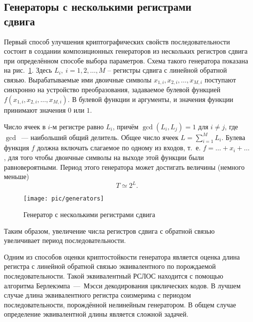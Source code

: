 \subsection[Генераторы с несколькими регистрами сдвига]{Генераторы с несколькими регистрами \protect\\ сдвига}

Первый способ улучшения криптографических свойств последовательности состоит в создании композиционных генераторов из нескольких регистров сдвига при определённом способе выбора параметров. Схема такого генератора показана на рис.~\ref{fig:generators}. Здесь $L_i, ~ i = 1, 2, \dots, M$ -- регистры сдвига с линейной обратной связью. Вырабатываемые ими двоичные символы $x_{1,i}, x_{2,i}, \dots, x_{M,i}$ поступают синхронно на устройство преобразования, задаваемое булевой функцией $f(x_{1,i}, x_{2,i}, \dots, x_{M,i})$. В булевой функции и аргументы, и значения функции принимают значения $0$ или $1$.

Число ячеек в $i$-м регистре равно $L_{i}$, причём $\gcd(L_i, L_j)=1$ для $i \neq j$, где $\gcd$~--- наибольший общий делитель. Общее число ячеек $L = \sum\limits_{i=1}^M L_i$. Булева функция $f$ должна включать слагаемое по одному из входов, т.~е. $f = \dots + x_i + \dots$, для того чтобы двоичные символы на выходе этой функции были равновероятными. Период этого генератора может достигать величины (немного меньше)
    \[ T \simeq 2^L. \]

\begin{figure}[!ht]
	\centering
	\texttt{[image: pic/generators]}
    \caption{Генератор с несколькими регистрами сдвига\label{fig:generators}}
\end{figure}

Таким образом, увеличение числа регистров сдвига с обратной связью увеличивает период последовательности.

Одним из способов оценки криптостойкости генератора является оценка длина регистра с линейной обратной связью эквивалентного по порождаемой последовательности. Такой эквивалентный РСЛОС находится с помощью алгоритма Берлекэмпа~---~Мэсси декодирования циклических кодов. В лучшем случае длина эквивалентного регистра соизмерима с периодом последовательности, порождённой нелинейным генератором. В общем случае определение эквивалентной длины является сложной задачей.
